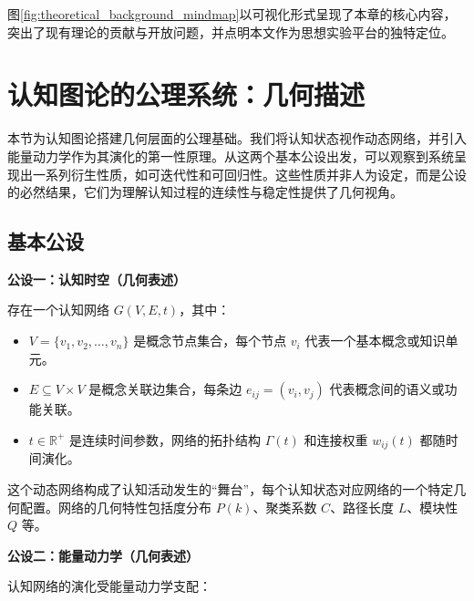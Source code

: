\documentclass[12pt,a4paper]{article}
\begin{document}
图\ref{fig:theoretical_background_mindmap}以可视化形式呈现了本章的核心内容，突出了现有理论的贡献与开放问题，并点明本文作为思想实验平台的独特定位。

\section{认知图论的公理系统：几何描述}

本节为认知图论搭建几何层面的公理基础。我们将认知状态视作动态网络，并引入能量动力学作为其演化的第一性原理。从这两个基本公设出发，可以观察到系统呈现出一系列衍生性质，如可迭代性和可回归性。这些性质并非人为设定，而是公设的必然结果，它们为理解认知过程的连续性与稳定性提供了几何视角。

\subsection{基本公设}

\textbf{公设一：认知时空（几何表述）}

存在一个认知网络 $G(V,E,t)$，其中：
\begin{itemize}
\item $V = \{v_1, v_2, \ldots, v_n\}$ 是概念节点集合，每个节点 $v_i$ 代表一个基本概念或知识单元。
\item $E \subseteq V \times V$ 是概念关联边集合，每条边 $e_{ij} = (v_i, v_j)$ 代表概念间的语义或功能关联。
\item $t \in \mathbb{R}^+$ 是连续时间参数，网络的拓扑结构 $\Gamma(t)$ 和连接权重 $w_{ij}(t)$ 都随时间演化。
\end{itemize}

这个动态网络构成了认知活动发生的“舞台”，每个认知状态对应网络的一个特定几何配置。网络的几何特性包括度分布 $P(k)$、聚类系数 $C$、路径长度 $L$、模块性 $Q$ 等。

\textbf{公设二：能量动力学（几何表述）}

认知网络的演化受能量动力学支配：
\end{document}
